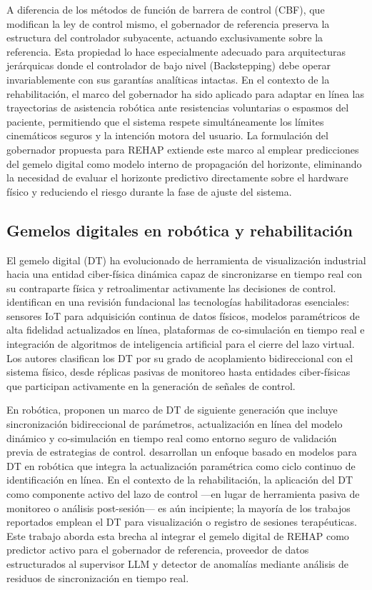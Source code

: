 \documentclass[a4paper,12pt]{article}
\begin{document}
A diferencia de los métodos de función de barrera de control (CBF), que modifican la ley de control mismo, el gobernador de referencia preserva la estructura del controlador subyacente, actuando exclusivamente sobre la referencia. Esta propiedad lo hace especialmente adecuado para arquitecturas jerárquicas donde el controlador de bajo nivel (Backstepping) debe operar invariablemente con sus garantías analíticas intactas. En el contexto de la rehabilitación, el marco del gobernador ha sido aplicado para adaptar en línea las trayectorias de asistencia robótica ante resistencias voluntarias o espasmos del paciente, permitiendo que el sistema respete simultáneamente los límites cinemáticos seguros y la intención motora del usuario. La formulación del gobernador propuesta para REHAP extiende este marco al emplear predicciones del gemelo digital como modelo interno de propagación del horizonte, eliminando la necesidad de evaluar el horizonte predictivo directamente sobre el hardware físico y reduciendo el riesgo durante la fase de ajuste del sistema.

\subsection{Gemelos digitales en robótica y rehabilitación}

El gemelo digital (DT) ha evolucionado de herramienta de visualización industrial hacia una entidad ciber-física dinámica capaz de sincronizarse en tiempo real con su contraparte física y retroalimentar activamente las decisiones de control. \citet{fuller2020digital} identifican en una revisión fundacional las tecnologías habilitadoras esenciales: sensores IoT para adquisición continua de datos físicos, modelos paramétricos de alta fidelidad actualizados en línea, plataformas de co-simulación en tiempo real e integración de algoritmos de inteligencia artificial para el cierre del lazo virtual. Los autores clasifican los DT por su grado de acoplamiento bidireccional con el sistema físico, desde réplicas pasivas de monitoreo hasta entidades ciber-físicas que participan activamente en la generación de señales de control.

En robótica, \citet{mazumder_next_2023} proponen un marco de DT de siguiente generación que incluye sincronización bidireccional de parámetros, actualización en línea del modelo dinámico y co-simulación en tiempo real como entorno seguro de validación previa de estrategias de control. \citet{gil_model-based_2025} desarrollan un enfoque basado en modelos para DT en robótica que integra la actualización paramétrica como ciclo continuo de identificación en línea. En el contexto de la rehabilitación, la aplicación del DT como componente activo del lazo de control ---en lugar de herramienta pasiva de monitoreo o análisis post-sesión--- es aún incipiente; la mayoría de los trabajos reportados emplean el DT para visualización o registro de sesiones terapéuticas. Este trabajo aborda esta brecha al integrar el gemelo digital de REHAP como predictor activo para el gobernador de referencia, proveedor de datos estructurados al supervisor LLM y detector de anomalías mediante análisis de residuos de sincronización en tiempo real.
\end{document}
